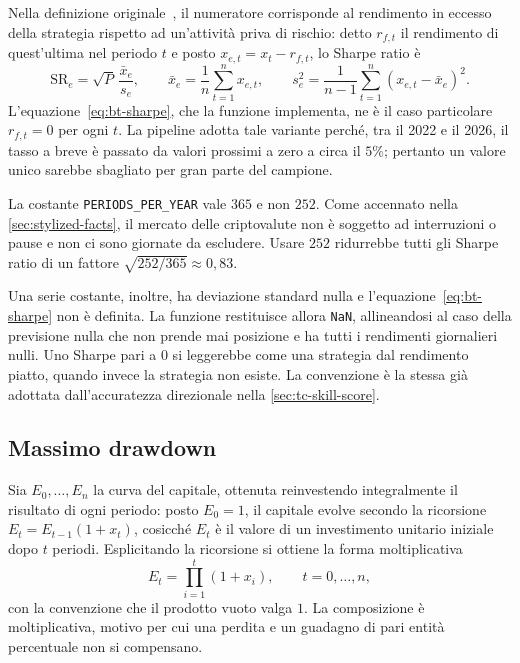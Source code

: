 Nella definizione originale~\cite{sharpe1966mutual}, il numeratore corrisponde al rendimento in eccesso della strategia rispetto ad un'attività priva di rischio: detto $r_{f,t}$ il rendimento di quest'ultima nel periodo $t$ e posto $x_{e,t}=x_t-r_{f,t}$, lo Sharpe ratio è
\[
\mathrm{SR}_e=\sqrt{P}\,\frac{\bar x_e}{s_e},\qquad
\bar x_e=\frac1n\sum_{t=1}^n x_{e,t},\qquad
s_e^2=\frac{1}{n-1}\sum_{t=1}^n(x_{e,t}-\bar x_e)^2.
\]
L'equazione~\eqref{eq:bt-sharpe}, che la funzione implementa, ne è il caso particolare $r_{f,t}=0$ per ogni $t$. La pipeline adotta tale variante perché, tra il 2022 e il 2026, il tasso a breve è passato da valori prossimi a zero a circa il $5\%$; pertanto un valore unico sarebbe sbagliato per gran parte del campione.

La costante \texttt{PERIODS\_PER\_YEAR} vale $365$ e non $252$. Come accennato nella \cref{sec:stylized-facts}, il mercato delle criptovalute non è soggetto ad interruzioni o pause e non ci sono giornate da escludere. Usare $252$ ridurrebbe tutti gli Sharpe ratio di un fattore $\sqrt{252/365}\approx0{,}83$.

Una serie costante, inoltre, ha deviazione standard nulla e l'equazione~\eqref{eq:bt-sharpe} non è definita. La funzione restituisce allora \texttt{NaN}, allineandosi al caso della previsione nulla che non prende mai posizione e ha tutti i rendimenti giornalieri nulli. Uno Sharpe pari a $0$ si leggerebbe come una strategia dal rendimento piatto, quando invece la strategia non esiste. La convenzione è la stessa già adottata dall'accuratezza direzionale nella \cref{sec:tc-skill-score}.

\subsection{Massimo drawdown}
\label{sec:bt-drawdown}

Sia $E_0,\dots,E_n$ la curva del capitale, ottenuta reinvestendo integralmente il risultato di ogni periodo: posto $E_0=1$, il capitale evolve secondo la ricorsione $E_t=E_{t-1}(1+x_t)$, cosicché $E_t$ è il valore di un investimento unitario iniziale dopo $t$ periodi. Esplicitando la ricorsione si ottiene la forma moltiplicativa
\[
E_t=\prod_{i=1}^{t}(1+x_i),\qquad t=0,\dots,n,
\]
con la convenzione che il prodotto vuoto valga $1$. La composizione è moltiplicativa, motivo per cui una perdita e un guadagno di pari entità percentuale non si compensano.

